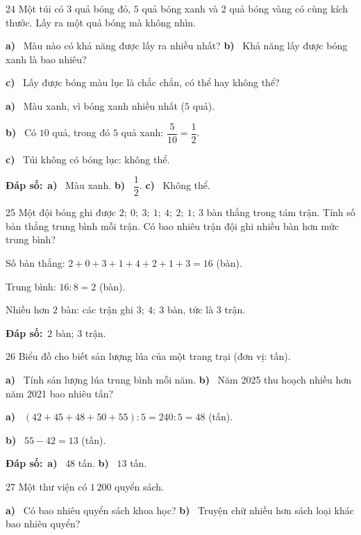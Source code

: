 \documentclass[11pt]{article}
\newif\ifsol \solfalse
\providecommand{\AnsWord}{Đáp số}
\newcommand{\dapso}[1]{\par\textbf{\AnsWord:}\ #1}
\newcommand{\probsol}[1]{%
  \begin{lrbox}{\solmeasure}\begin{minipage}{\dimexpr\linewidth-24pt\relax}#1\end{minipage}\end{lrbox}%
  \ifsol
    \begin{solbox}#1\end{solbox}%
  \else
    \setlength{\solht}{\dimexpr\ht\solmeasure+\dp\solmeasure+0.85cm\relax}%
    \ifdim\solht<1.35cm\setlength{\solht}{1.35cm}\fi
    \begin{tcolorbox}[colback=white,colframe=Line,boxrule=0.8pt,arc=5pt,
      left=8pt,right=8pt,top=4pt,bottom=4pt,height=\solht]{\footnotesize\color{Slate}\itshape\WorkWord}\end{tcolorbox}%
  \fi}
\newcommand{\pa}[1]{\textbf{#1)}\ }
\newcommand{\gap}{\vspace{0.3cm}}
\def\WorkWord{Bài làm:}
\def\AnsWord{Đáp số}
\begin{document}
\gap
\begin{probbox}{24}{\relax}
Một túi có $3$ quả bóng đỏ, $5$ quả bóng xanh và $2$ quả bóng vàng có cùng kích thước. Lấy ra một quả bóng mà không nhìn.\par
\pa{a} Màu nào có khả năng được lấy ra nhiều nhất? \quad \pa{b} Khả năng lấy được bóng xanh là bao nhiêu?\par
\pa{c} Lấy được bóng màu lục là chắc chắn, có thể hay không thể?
\end{probbox}
\probsol{
\pa{a} Màu xanh, vì bóng xanh nhiều nhất ($5$ quả).\par
\pa{b} Có $10$ quả, trong đó $5$ quả xanh: $\dfrac{5}{10}=\dfrac12$.\par
\pa{c} Túi không có bóng lục: không thể.
\dapso{\pa{a} Màu xanh. \pa{b} $\dfrac12$. \pa{c} Không thể.}}
\gap
\begin{probbox}{25}{\relax}
Một đội bóng ghi được $2;\ 0;\ 3;\ 1;\ 4;\ 2;\ 1;\ 3$ bàn thắng trong tám trận. Tính số bàn thắng trung bình mỗi trận. Có bao nhiêu trận đội ghi nhiều bàn hơn mức trung bình?
\end{probbox}
\probsol{
Số bàn thắng: $2+0+3+1+4+2+1+3=16$ (bàn).\par Trung bình: $16:8=2$ (bàn).\par Nhiều hơn $2$ bàn: các trận ghi $3;\ 4;\ 3$ bàn, tức là $3$ trận.
\dapso{$2$ bàn; $3$ trận.}}
\gap
\needspace{8.5cm}
\begin{probbox}{26}{\relax}
Biểu đồ cho biết sản lượng lúa của một trang trại (đơn vị: tấn).
\begin{center}
\end{center}
\pa{a} Tính sản lượng lúa trung bình mỗi năm. \quad \pa{b} Năm 2025 thu hoạch nhiều hơn năm 2021 bao nhiêu tấn?
\end{probbox}
\probsol{
\pa{a} $(42+45+48+50+55):5=240:5=48$ (tấn).\par
\pa{b} $55-42=13$ (tấn).
\dapso{\pa{a} $48$ tấn. \pa{b} $13$ tấn.}}
\gap
\needspace{7.5cm}
\begin{probbox}{27}{\relax}
Một thư viện có $1\,200$ quyển sách.
\begin{center}
\end{center}
\pa{a} Có bao nhiêu quyển sách khoa học? \quad \pa{b} Truyện chữ nhiều hơn sách loại khác bao nhiêu quyển?
\end{probbox}
\end{document}
